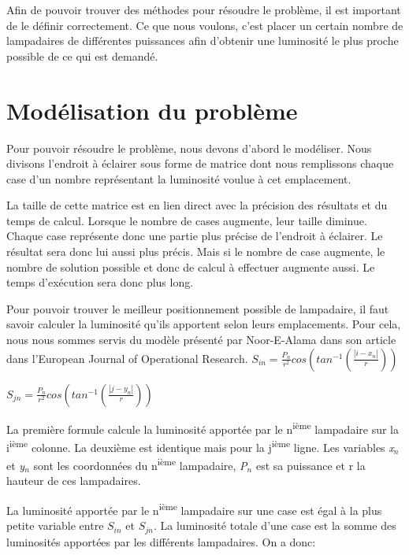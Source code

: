 Afin de pouvoir trouver des m\'{e}thodes pour r\'{e}soudre le probl\`{e}me, il est important de le d\'{e}finir correctement. Ce que nous voulons, c'est placer un certain nombre de lampadaires de différentes puissances afin d'obtenir une luminosit\'{e} le plus proche possible de ce qui est demand\'{e}.

\section{Mod\'{e}lisation du probl\`{e}me}
Pour pouvoir r\'{e}soudre le probl\`{e}me, nous devons d'abord le mod\'{e}liser.  Nous divisons l'endroit \`{a} \'{e}clairer sous forme de matrice dont nous remplissons chaque case d'un nombre repr\'{e}sentant la luminosit\'{e} voulue \`{a} cet emplacement.

La taille de cette matrice est en lien direct avec la pr\'{e}cision des r\'{e}sultats et du temps de calcul. Lorsque le nombre de cases augmente, leur taille diminue. Chaque case repr\'{e}sente donc une partie plus pr\'{e}cise de l'endroit \`{a} \'{e}clairer. Le r\'{e}sultat sera donc lui aussi plus pr\'{e}cis. Mais si le nombre de case augmente, le nombre de solution possible et donc de calcul \`{a} effectuer augmente aussi. Le temps d'ex\'{e}cution sera donc plus long.

Pour pouvoir trouver le meilleur positionnement possible de lampadaire, il faut savoir calculer la luminosité qu'ils apportent selon leurs emplacements. Pour cela, nous nous sommes servis du modèle présenté par Noor-E-Alama dans son article dans l'European Journal of Operational Research.
$
S_{in}=\frac{P_{n}}{r^{2}} cos \left (tan^{-1}\left (\frac{\left |i-x_{n}  \right |}{r}  \right )   \right )
$


$
S_{jn}=\frac{P_{n}}{r^{2}} cos \left (tan^{-1}\left (\frac{\left |j-y_{n}  \right |}{r}  \right )   \right )
$

La première formule calcule la luminosité apportée par le n\textsuperscript{ième} lampadaire sur la i\textsuperscript{ième} colonne. La deuxième est identique mais pour la j\textsuperscript{ième} ligne. Les variables \textit{x}$_{n}$ et \textit{y}$_{n}$ sont les coordonnées du n\textsuperscript{ième} lampadaire, \textit{P}$_{n}$ est sa puissance et r la hauteur de ces lampadaires.

La luminosité apportée par le n\textsuperscript{ième} lampadaire sur une case est égal à la plus petite variable entre $S_{in}$ et $S_{jn}$.
La luminosité totale d'une case est la somme des luminosités apportées par les différents lampadaires.
On a donc:

